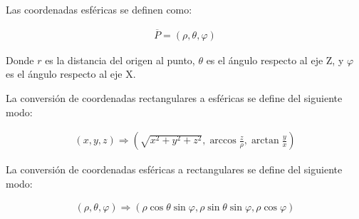 Las coordenadas esféricas se definen como:

\begin{eqnarray*}
  \overline{P} = \left(\rho,\theta,\varphi\right)
\end{eqnarray*}

Donde ${r}$ es la distancia del origen al punto, ${\theta}$ es el ángulo respecto al eje Z, y ${\varphi}$ es el ángulo respecto al eje X.

La conversión de coordenadas rectangulares a esféricas se define del siguiente modo:

\begin{eqnarray*}
  \left(x,y,z\right) \Rightarrow \left(\sqrt{x^2+y^2+z^2},\arccos\frac{z}{\rho},\arctan\frac{y}{x}\right)
\end{eqnarray*}

La conversión de coordenadas esféricas a rectangulares se define del siguiente modo:

\begin{eqnarray*}
  \left(\rho,\theta,\varphi\right) \Rightarrow \left(\rho\cos\theta\sin\varphi,\rho\sin\theta\sin\varphi,\rho\cos\varphi\right)
\end{eqnarray*}
